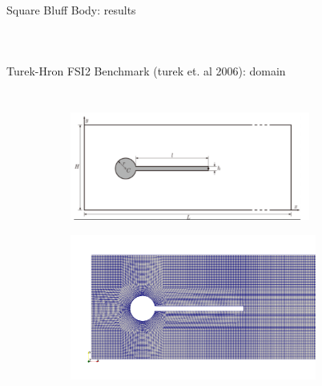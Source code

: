 \documentclass[10pt,t]{beamer}
\begin{document}
\begin{frame}{Square Bluff Body: results}
\begin{columns}
\begin{tabular}{ l | c  c }
		\end{tabular}


\end{columns}

\end{frame}




\begin{frame}{Turek-Hron FSI2 Benchmark (turek et. al 2006): domain}


\begin{columns}
    \begin{figure}[t]
    \vspace*{-1.5cm}
    \hspace*{-0.2cm}
	\centering
	  \begin{subfigure}[t]{\textwidth}
    \centering
    \includegraphics[width=0.865\textwidth, trim=0 0 50 0, clip]{images/FSI2/FSI2.png}
  \end{subfigure}
  \begin{subfigure}[t]{\textwidth}
    \hspace{3pt}
    \includegraphics[width=0.89\textwidth]{images/FSI2/FSI2-mesh.png}
  \end{subfigure}
	
	
	
	
    \end{figure}
    

\end{columns}
\end{frame}
\end{document}
